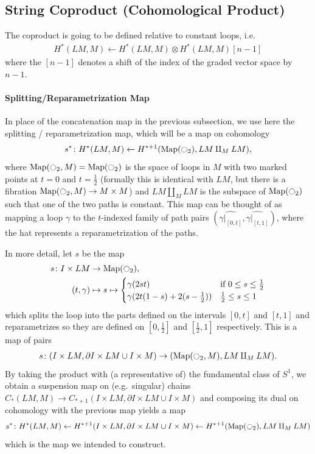 \documentclass{scrartcl}
\theoremstyle{plain}
\theoremstyle{definition}
\newcommand{\union}{\mathbin{\cup}}
\newcommand{\from}{\leftarrow}
\DeclareMathOperator{\Map}{Map}
\renewcommand{\coprod}{\mathbin{\amalg}}
\begin{document}
\subsection{String Coproduct (Cohomological Product)}

The coproduct is going to be defined relative to constant loops, i.e.
\begin{align*}
    H^*(LM, M) \from H^*(LM, M)\otimes H^*(LM, M)[n-1]
\end{align*}
where the $[n-1]$ denotes a shift of the index of the graded vector space by $n-1$. 

\paragraph{Splitting/Reparametrization Map} In place of the concatenation map in the previous subsection, we use here the splitting / reparametrization map, which will be a map on cohomology
\begin{align*}
    s^*\colon H^{*}(LM, M) \from H^{*+1}(\Map(\ocircle_2), LM\coprod_M LM),
\end{align*}
where $\Map(\ocircle_2, M) = \Map(\ocircle_2)$ is the space of loops in $M$ with two marked points at $t=0$ and $t=\frac 12$ (formally this is identical with $LM$, but there is a fibration $\Map(\ocircle_2, M)\to M\times M$) and $LM\coprod_M LM$ is the subspace of $\Map(\ocircle_2)$ such that one of the two paths is constant. This map can be thought of as mapping a loop $\gamma$ to the $t$-indexed family of path pairs $(\widehat{\gamma|_{[0, t]}}, \widehat{\gamma|_{[t, 1]}})$, where the hat represents a reparametrization of the paths. 

In more detail, let $s$ be the map 
\begin{align*}
    s\colon I\times LM & \to\Map(\ocircle_2),\\
    (t, \gamma) &\mapsto s\mapsto \begin{cases}
        \gamma(2 st) & \text{if}\ 0 \leq s \leq \frac 12\\
        \gamma(2t(1-s)+2(s-\frac 12))& \frac 12\leq s \leq 1
    \end{cases}
\end{align*}
which splits the loop into the parts defined on the intervals $[0, t]$ and $[t, 1]$ and reparametrizes so they are defined on $[0, \frac 12]$ and $[\frac 12, 1]$ respectively. This is a map of pairs
\begin{align*}
    s\colon (I\times LM, \partial I\times LM \union I\times M) \to (\Map(\ocircle_2, M), LM\coprod_M LM).
\end{align*} 
By taking the product with (a representative of) the fundamental class of $S^1$, we obtain a suspension map on (e.g.\ singular) chains $ C_{*}(LM, M) \to C_{*+1}(I\times LM, \partial I \times LM \union I\times M)$ and composing its dual on cohomology with the previous map yields a map 
\begin{align*}
    s^*\colon H^{*}(LM, M) \from H^{*+1}(I\times LM, \partial I \times LM \union I\times M) \from H^{*+1}(\Map(\ocircle_2), LM\coprod_M LM)
\end{align*}
which is the map we intended to construct.
\end{document}
